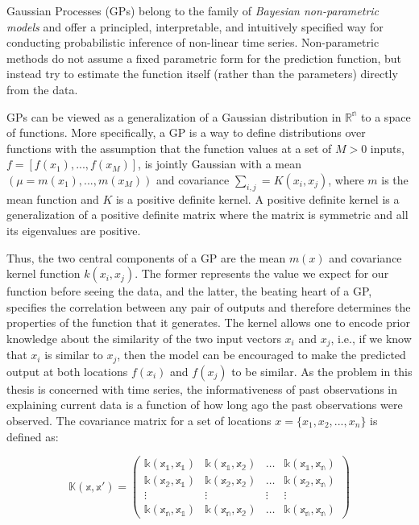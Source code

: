 Gaussian Processes (GPs) belong to the family of \textit{Bayesian non-parametric models} and offer a principled, interpretable, and intuitively specified way for conducting probabilistic inference of non-linear time series. Non-parametric methods do not assume a fixed parametric form for the prediction function, but instead try to estimate the function itself (rather than the parameters) directly from the data. 

GPs can be viewed as a generalization of a Gaussian distribution in $\mathbb{R^n}$ to a space of functions. More specifically, a GP is a way to define distributions over functions with the assumption that the function values at a set of $M > 0$ inputs, $f = [f(x_1), . . .,f(x_M)]$, is jointly Gaussian with a mean $(\mu = m(x_1), . . .,m(x_M))$ and covariance $\sum_{i, j} = K(x_i, x_j)$, where $m$ is the mean function and $K$ is a positive definite kernel. A positive definite kernel is a generalization of a positive definite matrix where the matrix is symmetric and all its eigenvalues are positive. 

Thus, the two central components of a GP are the mean $m(x)$ and covariance kernel function $k(x_i, x_j)$. The former represents the value we expect for our function before seeing the data, and the latter, the beating heart of a GP, specifies the correlation between any pair of outputs and therefore determines the properties of the function that it generates. The kernel allows one to encode prior knowledge about the similarity of the two input vectors $x_i$ and $x_j$, i.e., if we know that $x_i$ is similar to $x_j$, then the model can be encouraged to make the predicted output at both locations $f(x_i)$ and $f(x_j)$ to be similar. As the problem in this thesis is concerned with time series, the informativeness of past observations in explaining current data is a function of how long ago the past observations were observed. The covariance matrix for a set of locations $x = \{x_1, x_2, . . .,x_n\}$ is defined as:

\begin{equation}
\mathbb{K(x, x') = \begin{pmatrix}
k(x_1, x_1) & k(x_1, x_2) & \dots & k(x_1, x_n) \\
k(x_2, x_1) & k(x_2, x_2) & \dots & k(x_2, x_n) \\
\vdots & \vdots & \vdots & \vdots \\
k(x_n, x_1) & k(x_n, x_2) & \dots & k(x_n, x_n)
\end{pmatrix}}
\end{equation}

